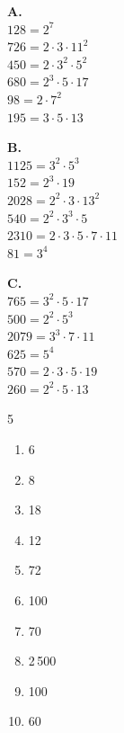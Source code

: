 \vspace{20pt}
\vspace{-10pt}\begin{minipage}[t]{0.32\textwidth}
\textbf{A.}\\[2pt]
$128 = 2^7$\\
$726 = 2 \cdot 3 \cdot 11^2$\\
$450 = 2 \cdot 3^2 \cdot 5^2$\\
$680 = 2^3 \cdot 5 \cdot 17$\\
$98 = 2 \cdot 7^2$\\
$195 = 3 \cdot 5 \cdot 13$
\end{minipage}%
\begin{minipage}[t]{0.34\textwidth}
\textbf{B.}\\[2pt]
$1125 = 3^2 \cdot 5^3$\\
$152 = 2^3 \cdot 19$\\
$2028 = 2^2 \cdot 3 \cdot 13^2$\\
$540 = 2^2 \cdot 3^3 \cdot 5$\\
$2310 = 2 \cdot 3 \cdot 5 \cdot 7 \cdot 11$\\
$81 = 3^4$
\end{minipage}%
\begin{minipage}[t]{0.32\textwidth}
\textbf{C.}\\[2pt]
$765 = 3^2 \cdot 5 \cdot 17$\\
$500 = 2^2 \cdot 5^3$\\
$2079 = 3^3 \cdot 7 \cdot 11$\\
$625 = 5^4$\\
$570 = 2 \cdot 3 \cdot 5 \cdot 19$\\
$260 = 2^2 \cdot 5 \cdot 13$
\end{minipage}

\vspace{30pt}

\vspace{-15pt}\begin{multicols}{5}
\begin{enumerate}[leftmargin=*,align=parleft, label=\alph*)]
\item 6
\item 8
\item 18  
\item 12  
\item 72  
\item 100  
\item 70
\item 2\,500
\item 100
\item 60
\end{enumerate}
\end{multicols}


